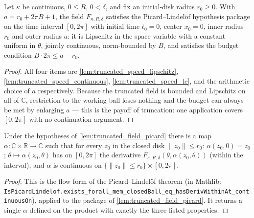\begin{lemma}

  \label{lem:truncated_field_picard}
  Let $\kappa$ be continuous, $0\le R$, $0<\delta$, and fix an initial-disk radius
  $r_0\ge0$. With $a=r_0+2\pi B+1$, the field $F_{\kappa,R,\delta}$ satisfies the
  Picard--Lindel\"of hypothesis package on the time interval $[0,2\pi]$ with initial time
  $t_0=0$, center $x_0=0$, inner radius $r_0$ and outer radius $a$: it is Lipschitz in the
  space variable with a constant uniform in $\theta$, jointly continuous, norm-bounded by
  $B$, and satisfies the budget condition $B\cdot 2\pi\le a-r_0$.
\end{lemma}

\begin{proof}

\leanok
  All four items are \cref{lem:truncated_speed_lipschitz},
  \cref{lem:truncated_speed_continuous}, \cref{lem:truncated_speed_le}, and the arithmetic
  choice of $a$ respectively. Because the truncated field is bounded and Lipschitz on all
  of $\mathbb C$, restriction to the working ball loses nothing and the budget can always
  be met by enlarging $a$ — this is the payoff of truncation: one application covers
  $[0,2\pi]$ with no continuation argument.
\end{proof}

\begin{lemma}

  \label{lem:spherical_flow_exists}
  Under the hypotheses of \cref{lem:truncated_field_picard} there is a map
  $\alpha:\mathbb C\times\mathbb R\to\mathbb C$ such that for every $z_0$ in the closed
  disk $\|z_0\|\le r_0$: $\alpha(z_0,0)=z_0$; $\theta\mapsto\alpha(z_0,\theta)$ has on
  $[0,2\pi]$ the derivative $F_{\kappa,R,\delta}(\theta,\alpha(z_0,\theta))$ (within the
  interval); and $\alpha$ is continuous on
  $\{\|z_0\|\le r_0\}\times[0,2\pi]$.
\end{lemma}

\begin{proof}

\leanok
  This is the flow form of the Picard--Lindel\"of theorem
  (in Mathlib:
  \texttt{IsPicardLindelof.exists\_forall\_mem\_closedBall\_eq\_hasDerivWithinAt\_continuousOn}),
  applied to the package of \cref{lem:truncated_field_picard}. It returns a single
  $\alpha$ defined on the product with exactly the three listed properties.
\end{proof}

